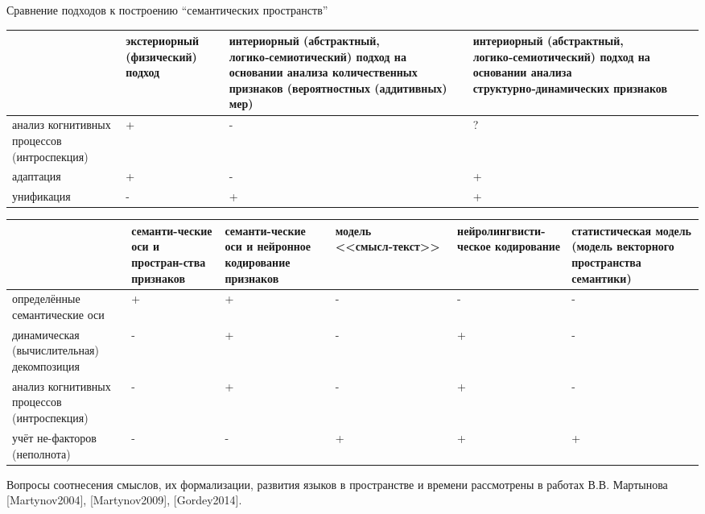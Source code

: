 Сравнение подходов к построению ``семантических пространств''

\begin{tabular}{|>{\centering\arraybackslash}m{3cm}|>{\centering\arraybackslash}m{3cm}|>{\centering\arraybackslash}m{5cm}|>{\centering\arraybackslash}m{5cm}|}
	\hline
	& экстериорный (физический) подход
	& интериорный (абстрактный, логико‑семиотический) подход на основании анализа количественных признаков (вероятностных (аддитивных) мер)
	& интериорный (абстрактный, логико‑семиотический) подход на основании анализа структурно‑динамических признаков
	\\
	\hline
	анализ когнитивных процессов (интроспекция)
	& +
	& -
	& ?
	\\
	\hline
	адаптация
	& +
	& -
	& +
	\\
	\hline
	унификация
	& -
	& +
	& +
	\\
	\hline
\end{tabular}

\begin{tabular}{|>{\centering\arraybackslash}m{3cm}|>{\centering\arraybackslash}m{2cm}|>{\centering\arraybackslash}m{2cm}|>{\centering\arraybackslash}m{3cm}|>{\centering\arraybackslash}m{3cm}|>{\centering\arraybackslash}m{3cm}|}
	\hline
	& семанти-ческие оси и простран-ства признаков
	& семанти-ческие оси и нейронное кодирование признаков
	& модель <<смысл‑текст>>
	& нейролингвисти-ческое кодирование
	& статистическая модель (модель векторного пространства семантики)
	\\
	\hline
	определённые семантические оси
	& +
	& +
	& -
	& -
	& -
	\\
	\hline
	динамическая (вычислительная) декомпозиция
	& -
	& +
	& -
	& +
	& -
	\\
	\hline
	анализ когнитивных процессов (интроспекция)
	& -
	& +
	& -
	& +
	& -
	\\
	\hline
	учёт не-факторов (неполнота)
	& -
	& -
	& +
	& +
	& +
	\\
	\hline
\end{tabular}


Вопросы соотнесения смыслов, их формализации, развития языков в пространстве и времени рассмотрены в работах В.В. Мартынова [Martynov2004], [Martynov2009], [Gordey2014].

